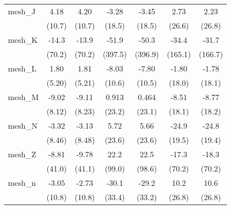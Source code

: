 \begin{tabular}{lcccccc}
   mesh\_J                                                     & 4.18          & 4.20          & -3.28         & -3.45         & 2.73           & 2.23\\   
                                                               & (10.7)        & (10.7)        & (18.5)        & (18.5)        & (26.6)         & (26.8)\\   
   mesh\_K                                                     & -14.3         & -13.9         & -51.9         & -50.3         & -34.4          & -31.7\\   
                                                               & (70.2)        & (70.2)        & (397.5)       & (396.9)       & (165.1)        & (166.7)\\   
   mesh\_L                                                     & 1.80          & 1.81          & -8.03         & -7.80         & -1.80          & -1.78\\   
                                                               & (5.20)        & (5.21)        & (10.6)        & (10.5)        & (18.0)         & (18.1)\\   
   mesh\_M                                                     & -9.02         & -9.11         & 0.913         & 0.464         & -8.51          & -8.77\\   
                                                               & (8.12)        & (8.23)        & (23.2)        & (23.1)        & (18.1)         & (18.2)\\   
   mesh\_N                                                     & -3.32         & -3.13         & 5.72          & 5.66          & -24.9          & -24.8\\   
                                                               & (8.46)        & (8.48)        & (23.6)        & (23.6)        & (19.5)         & (19.4)\\   
   mesh\_Z                                                     & -8.81         & -9.78         & 22.2          & 22.5          & -17.3          & -18.3\\   
                                                               & (41.0)        & (41.1)        & (99.0)        & (98.6)        & (70.2)         & (70.2)\\   
   mesh\_n                                                     & -3.05         & -2.73         & -30.1         & -29.2         & 10.2           & 10.6\\   
                                                               & (10.8)        & (10.8)        & (33.4)        & (33.2)        & (26.8)         & (26.8)\\   

\end{tabular}
